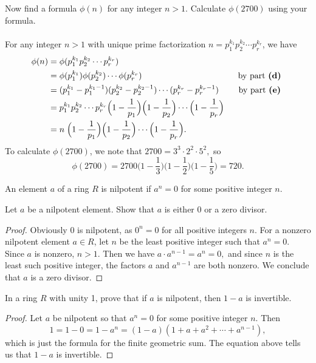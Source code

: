 \documentclass{article}
\newenvironment{problem2}[1]{\noindent {\bf (#1}}
{\medskip}
\newenvironment{definition}[1][Definition]{\begin{trivlist}
\item[\hskip \labelsep {\bfseries #1}]}{\end{trivlist}}
\newenvironment{problem1}[1]{\noindent {\bf Problem #1:}}
{\medskip}
\begin{document}
\begin{problem2}{f)} Now find a formula $\phi(n)$ for any integer $n>1$. Calculate $\phi(2700)$ using your formula.\\\\
For any integer $n>1$ with unique prime factorization $n=p_1^{k_1}p_2^{k_2}\cdots p_r^{k_r}$, we have \begin{align*}\phi(n) &= \phi(p_1^{k_1}p_2^{k_2}\cdots p_r^{k_r})\\
&=\phi(p_1^{k_1})\phi(p_2^{k_2})\cdots \phi(p_r^{k_r}) \quad\quad\quad\quad\quad\quad\quad\quad\quad\quad\quad \text{ by part \textbf{(d)} } \\
&=(p_1^{k_1}-p_1^{k_1-1})(p_2^{k_2}-p_2^{k_2-1})\cdots(p_r^{k_r}-p_r^{k_r-1}) \quad\quad \text{ by part \textbf{(e)} } \\
&=p_1^{k_1}p_2^{k_2}\cdots p_r^{k_r}\Big(1-\frac{1}{p_1}\Big)\Big(1-\frac{1}{p_2}\Big)\cdots\Big(1-\frac{1}{p_r}\Big)\\
&=n\;\Big(1-\frac{1}{p_1}\Big)\Big(1-\frac{1}{p_2}\Big)\cdots\Big(1-\frac{1}{p_r}\Big).
\end{align*}
To calculate $\phi(2700)$, we note that $2700=3^3\cdot2^2\cdot5^2,$ so $$\phi(2700)=2700\Big(1-\frac{1}{3}\Big)\Big(1-\frac{1}{2}\Big)\Big(1-\frac{1}{5}\Big)=720.$$
\end{problem2}
\vspace{2cm}

\begin{problem1}{2}\begin{definition}An element $a$ of a ring $R$ is nilpotent if $a^n=0$ for some positive integer $n$.\end{definition}
\end{problem1}

\begin{problem2}{a)} Let $a$ be a nilpotent element. Show that $a$ is either 0 or a zero divisor.
\begin{proof} Obviously $0$ is nilpotent, as $0^n=0$ for all positive integers $n$. For a nonzero nilpotent element $a\in R$, let $n$ be the least positive integer such that $a^n=0$. Since $a$ is nonzero, $n>1$. Then we have $a\cdot a^{n-1}=a^n =0,$ and since $n$ is the least such positive integer, the factors $a$ and $a^{n-1}$ are both nonzero. We conclude that $a$ is a zero divisor.
\end{proof}
\end{problem2}


\begin{problem2}{b)} In a ring $R$ with unity 1, prove that if $a$ is nilpotent, then $1-a$ is invertible.
\begin{proof} Let $a$ be nilpotent so that $a^n=0$ for some positive integer $n$. Then $$1=1-0=1-a^n=(1-a)(1+a+a^2+\cdots+a^{n-1}),$$ which is just the formula for the finite geometric sum. The equation above tells us that $1-a$ is invertible.
\end{proof}
\end{problem2}
\end{document}
